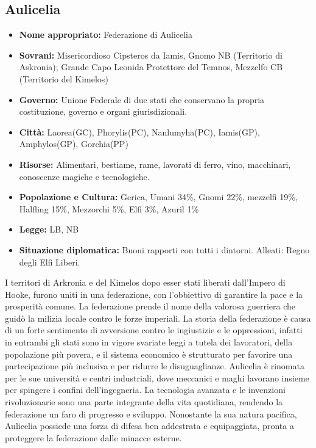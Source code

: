 \documentclass[a4paper]{report}
\begin{document}
\begin{multicols}{2}
\subsection*{Aulicelia}
\begin{itemize}
	\item \textbf{Nome appropriato: }Federazione di Aulicelia
	\item \textbf{Sovrani: }Misericordioso Cipsteros da Iamis, Gnomo NB (Territorio di Askronia); Grande Capo Leonida Protettore del Temnos, Mezzelfo CB (Territorio del Kimelos)
	\item \textbf{Governo: }Unione Federale di due stati che conservano la propria costituzione, governo e organi giurisdizionali.
	\item \textbf{Città: }Laorea(GC), Phorylis(PC), Nanlumyha(PC), Iamis(GP), Amphylos(GP), Gorchia(PP)
	\item \textbf{Risorse: }Alimentari, bestiame, rame, lavorati di ferro, vino, macchinari, conoscenze magiche e tecnologiche.
	\item \textbf{Popolazione e Cultura: }Gerica, Umani 34\%, Gnomi 22\%, mezzelfi 19\%, Halfling 15\%, Mezzorchi 5\%, Elfi 3\%, Azuril 1\%
	\item \textbf{Legge:} LB, NB
	\item \textbf{Situazione diplomatica: }Buoni rapporti con tutti i dintorni. Alleati: Regno degli Elfi Liberi.
\end{itemize}
I territori di Arkronia e del Kimelos dopo esser stati liberati dall'Impero di Hooke, furono uniti in una federazione, con l'obbiettivo di garantire la pace e la prosperità comune. La federazione prende il nome della valorosa guerriera che guidò la milizia locale contro le forze imperiali. La storia della federazione è causa di un forte sentimento di avversione contro le ingiustizie e le oppressioni, infatti in entrambi gli stati sono in vigore svariate leggi a tutela dei lavoratori, della popolazione più povera, e il sistema economico è strutturato per favorire una partecipazione più inclusiva e per ridurre le disuguaglianze.  Aulicelia è rinomata per le sue università e centri industriali, dove meccanici e maghi lavorano insieme per spingere i confini dell'ingegneria. La tecnologia avanzata e le invenzioni rivoluzionarie sono una parte integrante della vita quotidiana, rendendo la federazione un faro di progresso e sviluppo. Nonostante la sua natura pacifica, Aulicelia possiede una forza di difesa ben addestrata e equipaggiata, pronta a proteggere la federazione dalle minacce esterne.


\end{multicols}
\end{document}
